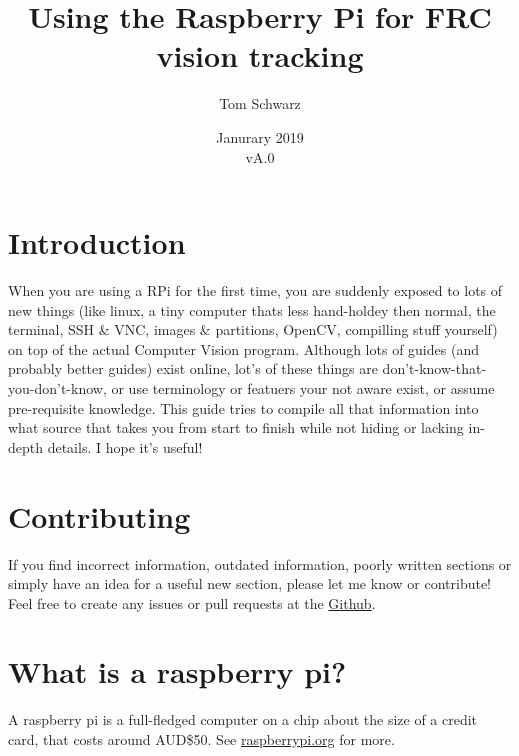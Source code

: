 \documentclass[11pt, titlepage]{article}
\title{Using the Raspberry Pi for FRC vision tracking}
\author{Tom Schwarz}
\date{Janurary 2019\\vA.0} %
\begin{document}
\maketitle

\tableofcontents

\section{Introduction}
\label{sec:introduction}
When you are using a RPi for the first time, you are suddenly exposed to lots of new things (like linux, a tiny computer thats less hand-holdey then normal, the terminal, SSH \& VNC, images \& partitions, OpenCV, compilling stuff yourself) on top of the actual Computer Vision program. Although lots of guides (and probably better guides) exist online, lot's of these things are don't-know-that-you-don't-know, or use terminology or featuers your not aware exist, or assume pre-requisite knowledge. This guide tries to compile all that information into what source that takes you from start to finish while not hiding or lacking in-depth details. I hope it's useful!

\section{Contributing}
\label{sec:contributing}
If you find incorrect information, outdated information, poorly written sections or simply have an idea for a useful new section, please let me know or contribute! Feel free to create any issues or pull requests at the \href{https://github.com/tomiam8/Documentation}{Github}. 

\pagebreak

\section{What is a raspberry pi?}
\label{sec:What-RPI}
A raspberry pi is a full-fledged computer on a chip about the size of a credit card, that costs around AUD\$50. See \href{www.raspberrypi.org}{raspberrypi.org} for more.
\end{document}
